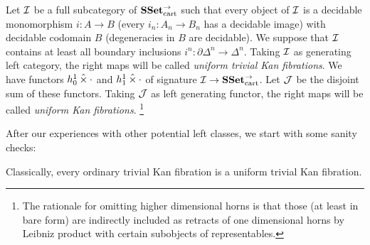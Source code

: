\documentclass[reqno,10pt,a4paper,oneside]{amsart}
\begin{document}
Let $\cal{I}$ be a full subcategory of $\SSet_{\text{cart}}^{\to}$ such that every object of $\cal{I}$ is a decidable monomorphism $i : A \to B$ (\ie every $i_n : A_n \to B_n$ has a decidable image) with decidable codomain $B$ (\ie degeneracies in $B$ are decidable).
We suppose that $\cal{I}$ contains at least all boundary inclusions $i^n : \partial \Delta^n \to \Delta^n$.
Taking $\cal{I}$ as generating left category, the right maps will be called \emph{uniform trivial Kan fibrations}.
We have functors $h_0^1 \hattimes \arghole$ and $h_1^1 \hattimes \arghole$ of signature $\cal{I} \to \SSet_{\text{cart}}^{\to}$.
Let $\cal{J}$ be the disjoint sum of these functors.
Taking $\cal{J}$ as left generating functor, the right maps will be called \emph{uniform Kan fibrations}.
\footnote{The rationale for omitting higher dimensional horns is that those (at least in bare form) are indirectly included as retracts of one dimensional horns by Leibniz product with certain subobjects of representables.}

After our experiences with other potential left classes, we start with some sanity checks:

\begin{lemma}
Classically, every ordinary trivial Kan fibration is a uniform trivial Kan fibration.
\end{lemma}
\end{document}
